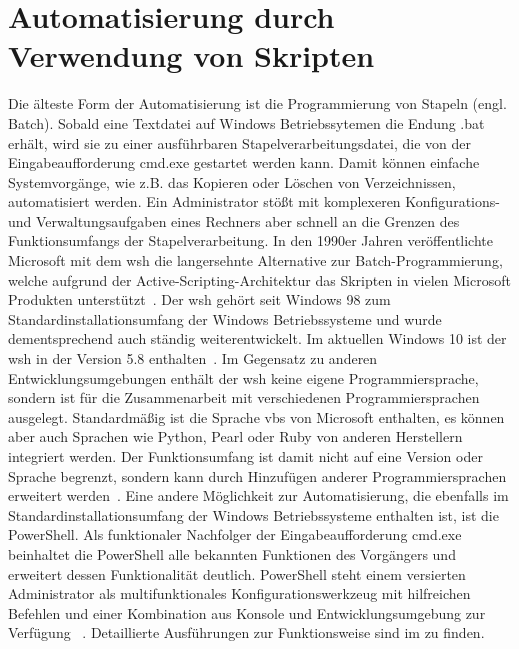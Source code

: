 \section{Automatisierung durch Verwendung von Skripten}
Die älteste Form der Automatisierung ist die Programmierung von Stapeln (engl. Batch). Sobald eine Textdatei auf Windows Betriebssytemen die Endung .bat erhält, wird sie zu einer ausführbaren Stapelverarbeitungsdatei, die von der Eingabeaufforderung cmd.exe gestartet werden kann. Damit können einfache Systemvorgänge, wie z.B. das Kopieren oder Löschen von Verzeichnissen, automatisiert werden. Ein Administrator stößt mit komplexeren Konfigurations- und Verwaltungsaufgaben eines Rechners aber schnell an die Grenzen des Funktionsumfangs der Stapelverarbeitung. In den 1990er Jahren veröffentlichte Microsoft mit dem \acrfull{wsh} die langersehnte Alternative zur Batch-Programmierung, welche aufgrund der Active-Scripting-Architektur das Skripten in vielen Microsoft Produkten unterstützt~\cite[S.~1]{Schwichtenberg2016}.
Der \acrlong{wsh} gehört seit Windows 98 zum Standardinstallationsumfang der Windows Betriebssysteme und wurde dementsprechend auch ständig weiterentwickelt. Im aktuellen Windows 10 ist der \acrlong{wsh} in der Version 5.8 enthalten~\cite[S.~2]{Schwichtenberg2016}. Im Gegensatz zu anderen Entwicklungsumgebungen enthält der \acrlong{wsh} keine eigene Programmiersprache, sondern ist für die Zusammenarbeit mit verschiedenen Programmiersprachen ausgelegt. Standardmäßig ist die Sprache \acrfull{vbs} von Microsoft enthalten, es können aber auch Sprachen wie Python, Pearl oder Ruby von anderen Herstellern integriert werden. Der Funktionsumfang ist damit nicht auf eine Version oder Sprache begrenzt, sondern kann durch Hinzufügen anderer Programmiersprachen erweitert werden~\cite[S.~4]{Schwichtenberg2016}.
Eine andere Möglichkeit zur Automatisierung, die ebenfalls im Standardinstallationsumfang der Windows Betriebssysteme enthalten ist, ist die PowerShell. Als funktionaler Nachfolger der Eingabeaufforderung cmd.exe beinhaltet die PowerShell alle bekannten Funktionen des Vorgängers und erweitert dessen Funktionalität deutlich. PowerShell steht einem versierten Administrator als multifunktionales Konfigurationswerkzeug mit hilfreichen Befehlen und einer Kombination aus Konsole und Entwicklungsumgebung zur Verfügung ~\cite[S.~399]{Schwichtenberg2016}. Detaillierte Ausführungen zur Funktionsweise sind im  zu finden.
